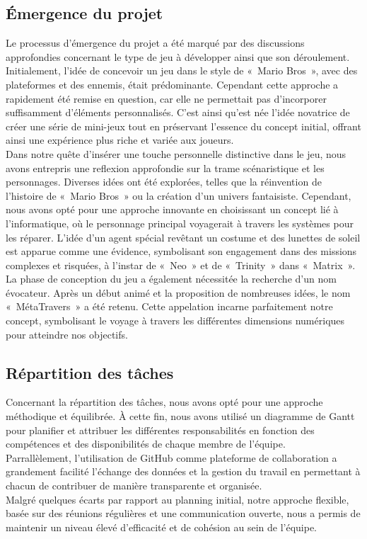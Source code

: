 \documentclass[12pt,a4paper]{article}
\begin{document}
        \subsection{Émergence du projet}
            \tabto{1cm} Le processus d'émergence du projet a été marqué par des discussions approfondies concernant le type de jeu à développer ainsi que son déroulement. Initialement, l'idée de concevoir un jeu dans le style de «~Mario Bros~», avec des plateformes et des ennemis, était prédominante. Cependant cette approche a rapidement été remise en question, car elle ne permettait pas d'incorporer suffisamment d'éléments personnalisés. C'est ainsi qu'est née l'idée novatrice de créer une série de mini-jeux tout en préservant l'essence du concept initial, offrant ainsi une expérience plus riche et variée aux joueurs.\\

            Dans notre quête d'insérer une touche personnelle distinctive dans le jeu, nous avons entrepris une reflexion approfondie sur la trame scénaristique et les personnages. Diverses idées ont été explorées, telles que la réinvention de l'histoire de «~Mario Bros~» ou la création d'un univers fantaisiste. Cependant, nous avons opté pour une approche innovante en choisissant un concept lié à l'informatique, où le personnage principal voyagerait à travers les systèmes pour les réparer. L'idée d'un agent spécial revêtant un costume et des lunettes de soleil est apparue comme une évidence, symbolisant son engagement dans des missions complexes et risquées, à l'instar de «~Neo~» et de «~Trinity~» dans «~Matrix~».\\

            La phase de conception du jeu a également nécessitée la recherche d'un nom évocateur. Après un début animé et la proposition de nombreuses idées, le nom «~MétaTravers~» a été retenu. Cette appelation incarne parfaitement notre concept, symbolisant le voyage à travers les différentes dimensions numériques pour atteindre nos objectifs.\\
            
        \subsection{Répartition des tâches}
            \tabto{1cm} Concernant la répartition des tâches, nous avons opté pour une approche méthodique et équilibrée. À cette fin, nous avons utilisé un diagramme de Gantt pour planifier et attribuer les différentes responsabilités en fonction des compétences et des disponibilités de chaque membre de l'équipe.\\Parrallèlement, l'utilisation de GitHub comme plateforme de collaboration a grandement facilité l'échange des données et la gestion du travail en permettant à chacun de contribuer de manière transparente et organisée.\\Malgré quelques écarts par rapport au planning initial, notre approche flexible, basée sur des réunions régulières et une communication ouverte, nous a permis de maintenir un niveau élevé d'efficacité et de cohésion au sein de l'équipe.\\
\end{document}
